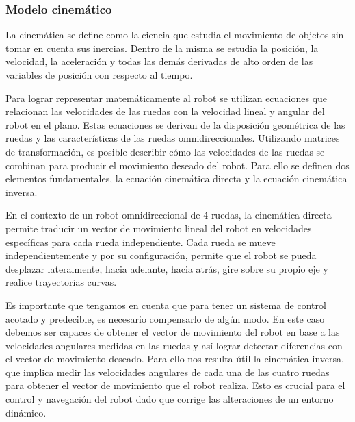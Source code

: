 

\subsubsection{Modelo cinemático}

La cinemática se define como la ciencia que estudia el movimiento de objetos sin tomar en cuenta sus inercias. Dentro de la misma se estudia la posición, la velocidad, la aceleración y todas las demás derivadas de alto orden de las variables de posición con respecto al tiempo.

Para lograr representar matemáticamente al robot se utilizan ecuaciones que relacionan las velocidades de las ruedas con la velocidad lineal y angular del robot en el plano. Estas ecuaciones se derivan de la disposición geométrica de las ruedas y las características de las ruedas omnidireccionales. Utilizando matrices de transformación, es posible describir cómo las velocidades de las ruedas se combinan para producir el movimiento deseado del robot. Para ello se definen dos elementos fundamentales, la ecuación cinemática directa y la ecuación cinemática inversa. \cite{tzafestas2013introduction}

En el contexto de un robot omnidireccional de 4 ruedas, la cinemática directa permite traducir un vector de movimiento lineal del robot en velocidades específicas para cada rueda independiente. Cada rueda se mueve independientemente y por su configuración, permite que el robot se pueda desplazar lateralmente, hacia adelante, hacia atrás, gire sobre su propio eje y realice trayectorias curvas. \cite{rijalusalamkinematics}

Es importante que tengamos en cuenta que para tener un sistema de control acotado y predecible, es necesario compensarlo de algún modo. En este caso debemos ser capaces de obtener el vector de movimiento del robot en base a las velocidades angulares medidas en las ruedas y así lograr detectar diferencias con el vector de movimiento deseado. Para ello nos resulta útil la cinemática inversa, que implica medir las velocidades angulares de cada una de las cuatro ruedas para obtener el vector de movimiento que el robot realiza. Esto es crucial para el control y navegación del robot dado que corrige las alteraciones de un entorno dinámico.

